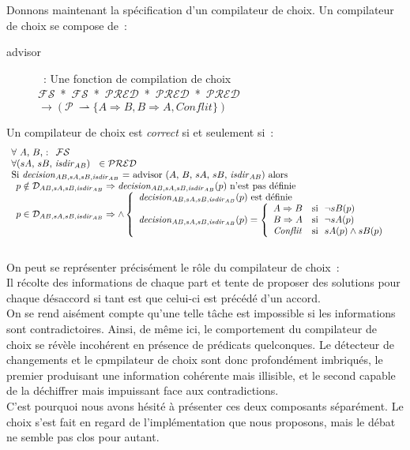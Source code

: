 \documentclass[11pt]{report}
\newcommand{\Conflit}{\ensuremath{\mathit{Conflit}}}
\newcommand{\fs}{\ensuremath{\mathcal{FS}}}
\newcommand{\pred}{\ensuremath{\mathcal{PRED}}}
\newcommand{\path}{\ensuremath{\mathcal{P}}}
\newcommand{\isdira}[2]{\ensuremath{\mathit{isdir}_{#1#2}}}
\begin{document}
{\begin{equation}
\end{equation} 
Donnons maintenant la sp\'ecification d'un compilateur de choix.
Un compilateur de choix se compose de~: 
 \begin{description}
  \item [advisor]~: Une fonction de compilation de choix\\
 \mbox{\fs\ * \fs\ * \pred\ * \pred\ * \pred\ 
 $\rightarrow (\path\ \rightharpoonup \{ A \Rightarrow B, B \Rightarrow A, \Conflit \} ) $}
 \end{description}
Un compilateur de choix est \emph{correct} si et seulement si~:
\[
\begin{array}{l}
\forall \mbox{\ $A$, $B$,~: \ } \fs\ \\
\forall \mbox{($sA$, $sB$, \isdira{A}{B}) \ } \in \pred\ \\
\mbox{Si $\mathit{decision}_{AB,sA,sB,\isdira{A}{B}}$ = 
advisor ($A$, $B$, $sA$, $sB$, \isdira{A}{B}) alors}\\ 
 \begin{array}{ll}
   p \notin \mathcal{D}_{AB,sA,sB,\isdira{A}{B}} \Rightarrow \mathit{decision}_{AB,sA,sB,\isdira{A}{B}}(p) \mbox{\ n'est pas d\'efinie}\\
   p \in \mathcal{D}_{AB,sA,sB,\isdira{A}{B}}  \Rightarrow \wedge \left\{ 
   \begin{array}{ll} 
    \mathit{decision}_{AB,sA,sB,\isdira{A}{B}}(p) \mbox{\ est d\'efinie}\\
    \mathit{decision}_{AB,sA,sB,\isdira{A}{B}}(p) = \left\{ 
      \begin{array}{ll}
        A \Rightarrow B & \mbox{si \ } \neg sB(p)\\
        B \Rightarrow A & \mbox{si \ } \neg sA(p)\\
        \Conflit        & \mbox{si \ } sA(p) \wedge sB(p)
      \end{array} \right.
   \end{array} \right.
 \end{array}
\end{array}
\]\\
On peut se repr\'esenter pr\'ecis\'ement le r\^ole du compilateur de choix~:\\
Il r\'ecolte des informations de chaque part et tente de proposer des 
solutions pour chaque d\'esaccord si tant est que celui-ci est 
pr\'ec\'ed\'e d'un accord.\\
On se rend ais\'ement compte qu'une telle t\^ache est impossible si les 
informations sont contradictoires. Ainsi, de m\^eme ici, le comportement 
du compilateur de choix se r\'ev\`ele incoh\'erent en pr\'esence de 
pr\'edicats quelconques. 
Le d\'etecteur de changements et le cpmpilateur de choix sont donc 
profond\'ement imbriqu\'es, le premier produisant une information 
coh\'erente mais illisible, et le second capable de la
d\'echiffrer mais impuissant face aux contradictions.\\
C'est pourquoi nous avons h\'esit\'e \`a pr\'esenter ces deux composants s\'epar\'ement.
Le choix s'est fait en regard de l'impl\'ementation que nous proposons, 
mais le d\'ebat ne semble pas clos pour autant.
}
\end{document}
